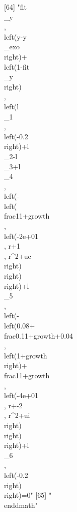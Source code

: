  [64] "{{fit\\_y}}\\, \\left({y}-{{y\\_exo}}\\right)+\\left(1-{{fit\\_y}}\\right)\\, \\left({{l\\_1}}\\, \\left(-0.2\\right)+{{l\\_2}}-{{l\\_3}}+{{l\\_4}}\\, \\left(-\\left(\\frac{1}{1+{growth}}\\, \\left(-2e+01\\, {r}+1\\, {r}^{2}+{uc}\\right)\\right)\\right)+{{l\\_5}}\\, \\left(-\\left(0.08+\\frac{0.1}{1+{growth}}+0.04\\, \\left(1+{growth}\\right)+\\frac{1}{1+{growth}}\\, \\left(-4e+01\\, {r}+-2\\, {r}^{2}+{ui}\\right)\\right)\\right)+{{l\\_6}}\\, \\left(-0.2\\right)\\right)=0"
 [65] "\\end{dmath}"                                                                                                                                                                                                                                                                                                                                                                                                                                                                                
